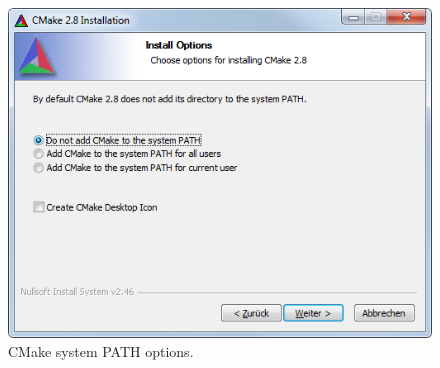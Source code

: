 \begin{enumerate}
\begin{figure}[htbp]
	\centering
	\includegraphics[scale=0.75]{figures/PNG/setup_cmake_path.png}
	\caption{CMake system PATH options.}
	\label{fig:setup_cmake_path}
\end{figure}

\end{enumerate}
